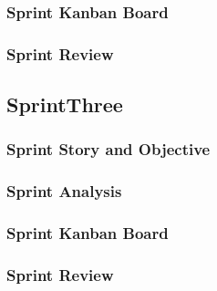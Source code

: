 \subsubsection{Sprint Kanban Board}

\subsubsection{Sprint Review}

\subsection{SprintThree}

\subsubsection{Sprint Story and Objective}

\subsubsection{Sprint Analysis}

\subsubsection{Sprint Kanban Board}

\subsubsection{Sprint Review}
